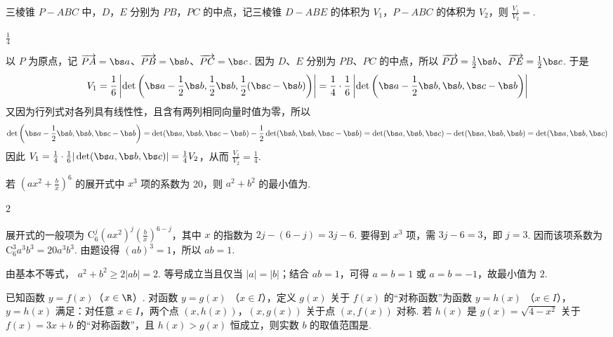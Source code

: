 \begin{problem}
三棱锥 \(P - ABC\) 中，\(D\)，\(E\) 分别为 \(PB\)，\(PC\) 的中点，记三棱锥 \(D - ABE\) 的体积为 \(V_{1}\)，\(P - ABC\) 的体积为 \(V_{2}\)，则 \(\frac{V_{1}}{V_{2}} = \)\fillinblank{}.
\end{problem}

\begin{answer}
\(\frac{1}{4}\)
\end{answer}

\begin{solution}
以 \(P\) 为原点，记 \(\overrightarrow{PA}=\bs a\)、\(\overrightarrow{PB}=\bs b\)、\(\overrightarrow{PC}=\bs c\). 因为 \(D\)、\(E\) 分别为 \(PB\)、\(PC\) 的中点，所以
\(\overrightarrow{PD}=\frac12\bs b\)、\(\overrightarrow{PE}=\frac12\bs c\). 于是
\[
V_1=\frac16\left|\det\left(\bs a-\frac12\bs b,\frac12\bs b,\frac12(\bs c-\bs b)\right)\right|
=\frac14\cdot\frac16\left|\det\left(\bs a-\frac12\bs b,\bs b,\bs c-\bs b\right)\right|
\]
又因为行列式对各列具有线性性，且含有两列相同向量时值为零，所以
\[
\det\left(\bs a-\frac12\bs b,\bs b,\bs c-\bs b\right)
=\det(\bs a,\bs b,\bs c-\bs b)-\frac12\det(\bs b,\bs b,\bs c-\bs b)
=\det(\bs a,\bs b,\bs c)-\det(\bs a,\bs b,\bs b)
=\det(\bs a,\bs b,\bs c)
\]
因此 \(V_1=\frac14\cdot\frac16|\det(\bs a,\bs b,\bs c)|=\frac14V_2\)，从而
\(\frac{V_1}{V_2}=\frac14\).
\end{solution}

\begin{problem}
若 \(\left(ax^2 + \frac{b}{x}\right)^6\) 的展开式中 \(x^3\) 项的系数为 20，则 \(a^2 + b^2\) 的最小值为\fillinblank{}.
\end{problem}

\begin{answer}
\(2\)
\end{answer}

\begin{solution}
展开式的一般项为
\(\mathrm C_6^j(ax^2)^j\left(\frac bx\right)^{6-j}\)，其中 \(x\) 的指数为
\(2j-(6-j)=3j-6\). 要得到 \(x^3\) 项，需 \(3j-6=3\)，即 \(j=3\). 因而该项系数为
\(\mathrm C_6^3a^3b^3=20a^3b^3\). 由题设得 \((ab)^3=1\)，所以 \(ab=1\).

由基本不等式，
\(a^2+b^2\geqslant2|ab|=2\). 等号成立当且仅当 \(|a|=|b|\)；结合 \(ab=1\)，可得 \(a=b=1\) 或 \(a=b=-1\)，故最小值为 \(2\).
\end{solution}

\begin{problem}
已知函数 \( y = f(x) \)（\( x \in \R \)）. 对函数 \( y = g(x) \) （\( x \in I \)），定义 \( g(x) \) 关于 \( f(x) \) 的“对称函数”为函数 \( y = h(x) \) （\( x \in I \)），\( y = h(x) \) 满足：对任意 \( x \in I \)，两个点 \((x, h(x))\)，\((x, g(x))\) 关于点 \((x, f(x))\) 对称. 若 \( h(x) \) 是 \( g(x) = \sqrt{4 - x^2} \) 关于 \( f(x) = 3x + b \) 的“对称函数”，且 \( h(x) > g(x) \) 恒成立，则实数 \( b \) 的取值范围是\fillinblank{}.
\end{problem}

